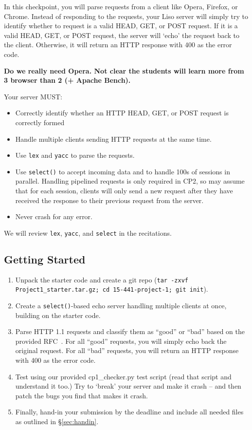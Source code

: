 \label{sec:cp1}
In this checkpoint, you will parse requests from a client like Opera, Firefox, or Chrome.
Instead of responding to the requests, your Liso server will simply try to identify whether to request is a valid HEAD, GET, or POST request.
If it is a valid HEAD, GET, or POST request, the server will `echo' the request back to the client.
Otherwise, it will return an HTTP response with 400 as the error code.

\textbf{Do we really need Opera.  Not clear the students will learn more from 3 browser than 2 (+ Apache Bench).}



\vspace{5pt}

\noindent Your server MUST:
\begin{itemize}
  \item Correctly identify whether an HTTP HEAD, GET, or POST request is correctly formed  
  \item Handle multiple clients sending HTTP requests at the same time.
  \item Use {\tt lex} and {\tt yacc} to parse the requests.
  \item Use {\tt select()} to accept incoming data and to handle 100s of sessions in parallel.  Handling pipelined requests is only required in CP2, so may assume that for each session, clients will only send a new request after they have received the response to their previous request from the server.
  \item Never crash for any error.
\end{itemize}
We will review {\tt lex}, {\tt yacc}, and {\tt select} in the recitations.

\subsection{Getting Started}
\begin{enumerate}
  \item Unpack the starter code and create a git repo (\texttt{tar -zxvf Project1\_starter.tar.gz; cd 15-441-project-1; git init}).

  \item Create a \texttt{select()}-based echo server handling multiple clients at once, building on the  starter code.  

  \item Parse HTTP 1.1 requests and classify them as ``good'' or ``bad'' based on the provided RFC~\cite{httprfc}. For all ``good'' requests, you will simply echo back the original request. For all ``bad'' requests, you will return an HTTP response with 400 as the error code.

  \item Test using our provided cp1\_checker.py test script (read that script and understand it too.) Try to `break' your server and make it crash -- and then patch the bugs you find that makes it crash.

  \item Finally, hand-in your
submission by the deadline and include all needed files as outlined in
\S\ref{sec:handin}.\\
\end{enumerate}

